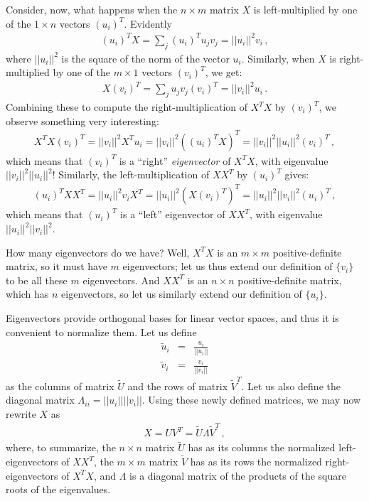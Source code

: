 Consider, now, what happens when the $n\times m$ matrix $X$ is left-multiplied by one of the $1\times n$ vectors $(u_i)^T$.  Evidently
\begin{eqnarray}
(u_i)^T X = \sum_j (u_i)^T u_j v_j = ||u_i||^2 v_i
\,,
\end{eqnarray}
where $||u_i||^2$ is the square of the norm of the vector $u_i$.  Similarly, when $X$ is right-multiplied by one of the $m\times 1$ vectors $(v_i)^T$, we get:
\begin{eqnarray}
X (v_i)^T = \sum_j u_j v_j (v_i)^T = ||v_i||^2 u_i
\,.
\end{eqnarray}
Combining these to compute the right-multiplication of $X^TX$ by $(v_i)^T$, we observe something very interesting:
\begin{eqnarray}
X^T X (v_i)^T =  ||v_i||^2 X^T u_i = ||v_i||^2 ( (u_i)^T X )^T = ||v_i||^2  ||u_i||^2  (v_i)^T
\,,
\end{eqnarray}
which means that $(v_i)^T$ is a ``right'' {\em eigenvector} of $X^T X$, with eigenvalue $||v_i||^2 ||u_i||^2$!  Similarly, the
left-multiplication of $XX^T$ by $(u_i)^T$ gives:
\begin{eqnarray}
(u_i)^T X X^T = ||u_i||^2 v_i X^T = ||u_i||^2  ( X (v_i)^T )^T = ||u_i||^2  ||v_i||^2  (u_i)^T
\,,
\end{eqnarray}
which means that $(u_i)^T$ is a ``left'' eigenvector of $XX^T$, with eigenvalue $||u_i||^2 ||v_i||^2$.

How many eigenvectors do we have?  Well, $X^T X$ is an $m\times m$
positive-definite matrix, so it must have $m$ eigenvectors; let us
thus extend our definition of $\{v_i\}$ to be all these $m$
eigenvectors.  And $XX^T$ is an $n\times n$ positive-definite matrix,
which has $n$ eigenvectors, so let us similarly extend our definition
of $\{u_i\}$.

Eigenvectors provide orthogonal bases for linear vector spaces, and thus it is convenient to normalize them.  Let us define
\begin{eqnarray}
  \tilde{u}_i &=& \frac{u_i}{||u_i||}
  \\
  \tilde{v}_i &=& \frac{v_i}{||v_i||}
\end{eqnarray}
as the columns of matrix $\tilde{U}$ and the rows of matrix
$\tilde{V}^T$.  Let us also define the diagonal matrix $\Lambda_{ii} = ||u_i|| ||v_i||$.  
Using these newly defined matrices, we may now rewrite $X$ as
\begin{eqnarray}
  X = UV^T =\tilde{U} \Lambda \tilde{V}^T
  \,,
\end{eqnarray}
where, to summarize, the $n\times n$ matrix $\tilde{U}$ has as its
columns the normalized left-eigenvectors of $XX^T$, the $m\times m$ 
matrix $\tilde{V}$ has as its rows the normalized
right-eigenvectors of $X^TX$, and $\Lambda$ is a diagonal matrix of
the products of the square roots of the eigenvalues.

